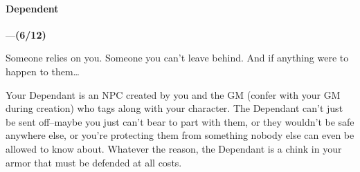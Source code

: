 \documentclass[oneside,11pt,english]{book}
\begin{document}
\paragraph{\label{bane:Dependent}Dependent}---\quad\textbf{(6/12) }\par
Someone relies on you. Someone you can’t leave behind. And if anything were to happen to them… 


Your Dependant is an NPC created by you and the GM (confer with your GM during creation) who tags 
along with your character. The Dependant can’t just be sent off--maybe you just can’t bear to part with 
them, or they wouldn’t be safe anywhere else, or you’re protecting them from something nobody else can 
even be allowed to know about. Whatever the reason, the Dependant is a chink in your armor that must be 
defended at all costs. 
\end{document}
